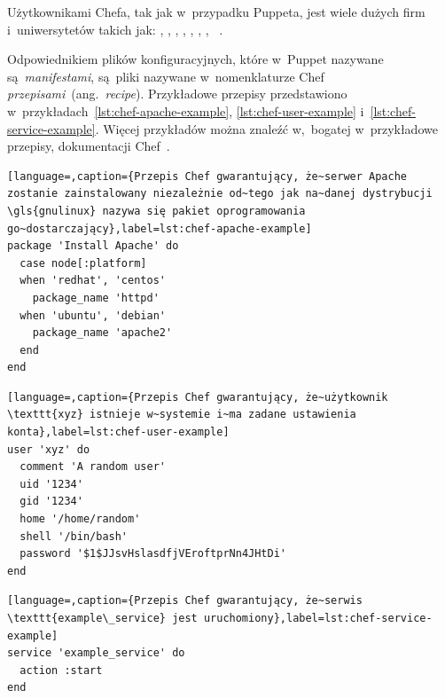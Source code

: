 \documentclass[thesis]{subfiles}
\begin{document}
Użytkownikami Chefa, tak jak w~przypadku Puppeta, jest wiele dużych firm i~uniwersytetów takich jak: , , , \emph{\facebook{}}, , , , ~\cite{chef-customers,puppet-chef-disney}.

Odpowiednikiem plików konfiguracyjnych, które w~Puppet nazywane są~\emph{manifestami}, są~pliki nazywane w~nomenklaturze Chef \emph{przepisami}~(ang.~\emph{recipe}). Przykładowe przepisy przedstawiono w~przykładach~\ref{lst:chef-apache-example}, \ref{lst:chef-user-example} i~\ref{lst:chef-service-example}. Więcej przykładów można znaleźć w,~bogatej w~przykładowe przepisy, dokumentacji Chef~\cite{chef-examples}.

\begin{lstlisting}[language=,caption={Przepis Chef gwarantujący, że~serwer Apache zostanie zainstalowany niezależnie od~tego jak na~danej dystrybucji \gls{gnulinux} nazywa się pakiet oprogramowania go~dostarczający},label=lst:chef-apache-example]
package 'Install Apache' do
  case node[:platform]
  when 'redhat', 'centos'
    package_name 'httpd'
  when 'ubuntu', 'debian'
    package_name 'apache2'
  end
end
\end{lstlisting}

\begin{lstlisting}[language=,caption={Przepis Chef gwarantujący, że~użytkownik \texttt{xyz} istnieje w~systemie i~ma zadane ustawienia konta},label=lst:chef-user-example]
user 'xyz' do
  comment 'A random user'
  uid '1234'
  gid '1234'
  home '/home/random'
  shell '/bin/bash'
  password '$1$JJsvHslasdfjVEroftprNn4JHtDi'
end
\end{lstlisting}

\begin{lstlisting}[language=,caption={Przepis Chef gwarantujący, że~serwis \texttt{example\_service} jest uruchomiony},label=lst:chef-service-example]
service 'example_service' do
  action :start
end
\end{lstlisting}

\end{document}
